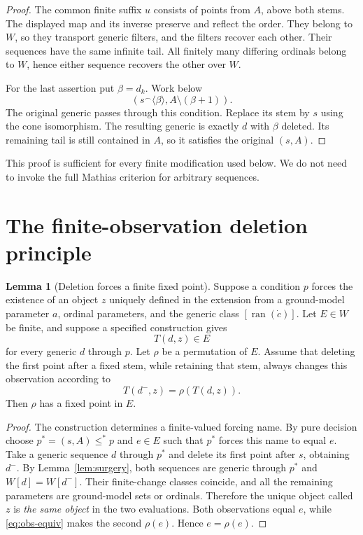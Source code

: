 \documentclass[11pt,letterpaper]{article}
\theoremstyle{definition}
\newtheorem{lemma}[definition]{Lemma}
\numberwithin{equation}{section}
\newcommand{\ran}{\operatorname{ran}}
\newcommand{\concat}{\mathbin{{}^{\frown}}}
\begin{document}
\begin{proof}
The common finite suffix $u$ consists of points from $A$, above both stems. The displayed map and its inverse preserve and reflect the order. They belong to $W$, so they transport generic filters, and the filters recover each other. Their sequences have the same infinite tail. All finitely many differing ordinals belong to $W$, hence either sequence recovers the other over $W$.

For the last assertion put $\beta=d_k$. Work below
\[
 (s\concat\langle\beta\rangle,
             A\setminus(\beta+1)).
\]
The original generic passes through this condition. Replace its stem by $s$ using the cone isomorphism. The resulting generic is exactly $d$ with $\beta$ deleted. Its remaining tail is still contained in $A$, so it satisfies the original $(s,A)$.
\end{proof}

This proof is sufficient for every finite modification used below. We do not need to invoke the full Mathias criterion for arbitrary sequences.

\section{The finite-observation deletion principle}\label{sec:observation}

\begin{lemma}[Deletion forces a finite fixed point]\label{lem:observation}
Suppose a condition $p$ forces the existence of an object $z$ uniquely defined in the extension from a ground-model parameter $a$, ordinal parameters, and the generic class $[\ran(\dot c)]$. Let $E\in W$ be finite, and suppose a specified construction gives
\[
 T(d,z)\in E
\]
for every generic $d$ through $p$. Let $\rho$ be a permutation of $E$. Assume that deleting the first point after a fixed stem, while retaining that stem, always changes this observation according to
\[
 T(d^-,z)=\rho(T(d,z)).
 \label{eq:obs-equiv}\tag{1}
\]
Then $\rho$ has a fixed point in $E$.
\end{lemma}

\begin{proof}
The construction determines a finite-valued forcing name. By pure decision choose $p^*=(s,A)\le^*p$ and $e\in E$ such that $p^*$ forces this name to equal $e$. Take a generic sequence $d$ through $p^*$ and delete its first point after $s$, obtaining $d^-$. By Lemma~\ref{lem:surgery}, both sequences are generic through $p^*$ and $W[d]=W[d^-]$. Their finite-change classes coincide, and all the remaining parameters are ground-model sets or ordinals. Therefore the unique object called $z$ is \emph{the same object} in the two evaluations. Both observations equal $e$, while \eqref{eq:obs-equiv} makes the second $\rho(e)$. Hence $e=\rho(e)$.
\end{proof}
\end{document}
